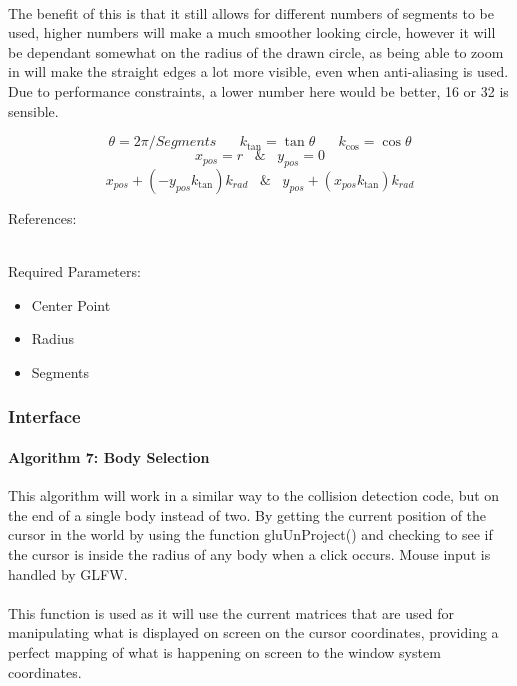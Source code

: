 \paragraph{}
The benefit of this is that it still allows for different numbers of segments to be used, higher numbers will make a much smoother looking circle, however it will be dependant somewhat on the radius of the drawn circle, as being able to zoom in will make the straight edges a lot more visible, even when anti-aliasing is used. Due to performance constraints, a lower number here would be better, 16 or 32 is sensible.

$$ \theta=2\pi/Segments \hspace{20pt} k_{\tan}=\tan\theta \hspace{20pt} k_{\cos}=\cos\theta $$
$$ x_{pos} = r \hspace{10pt} \& \hspace{10pt} y_{pos} = 0 $$
$$ x_{pos}+(-y_{pos}k_{\tan})k_{rad} \hspace{10pt} \& \hspace{10pt} y_{pos}+(x_{pos}k_{\tan})k_{rad}$$

References: \cite{circle} \\\

Required Parameters:
\begin{itemize}
\item Center Point
\item Radius
\item Segments
\end{itemize}

\pagebreak
\subsubsection{Interface}
\paragraph{Algorithm 7: Body Selection}
This algorithm will work in a similar way to the collision detection code, but on the end of a single body instead of two. By getting the current position of the cursor in the world by using the function gluUnProject() and checking to see if the cursor is inside the radius of any body when a click occurs. Mouse input is handled by GLFW.

\paragraph{}
This function is used as it will use the current matrices that are used for manipulating what is displayed on screen on the cursor coordinates, providing a perfect mapping of what is happening on screen to the window system coordinates.

